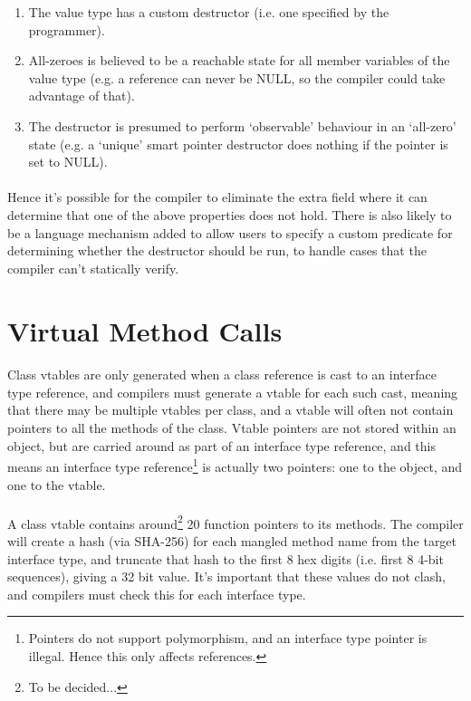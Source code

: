 \documentclass[12pt,twoside,notitlepage]{report}
\begin{document}
\begin{enumerate}
\item The value type has a custom destructor (i.e. one specified by the programmer).
\item All-zeroes is believed to be a reachable state for all member variables of the value type (e.g. a reference can never be NULL, so the compiler could take advantage of that).
\item The destructor is presumed to perform `observable' behaviour in an `all-zero' state (e.g. a `unique' smart pointer destructor does nothing if the pointer is set to NULL).
\end{enumerate}

\paragraph{}
Hence it's possible for the compiler to eliminate the extra field where it can determine that one of the above properties does not hold. There is also likely to be a language mechanism added to allow users to specify a custom predicate for determining whether the destructor should be run, to handle cases that the compiler can't statically verify.

\section{Virtual Method Calls}

\paragraph{}
Class vtables are only generated when a class reference is cast to an interface type reference, and compilers must generate a vtable for each such cast, meaning that there may be multiple vtables per class, and a vtable will often not contain pointers to all the methods of the class. Vtable pointers are not stored within an object, but are carried around as part of an interface type reference, and this means an interface type reference\footnote{Pointers do not support polymorphism, and an interface type pointer is illegal. Hence this only affects references.} is actually two pointers: one to the object, and one to the vtable.

\paragraph{}
A class vtable contains around\footnote{To be decided...} 20 function pointers to its methods. The compiler will create a hash (via SHA-256) for each mangled method name from the target interface type, and truncate that hash to the first 8 hex digits (i.e. first 8 4-bit sequences), giving a 32 bit value. It's important that these values do not clash, and compilers must check this for each interface type.
\end{document}
